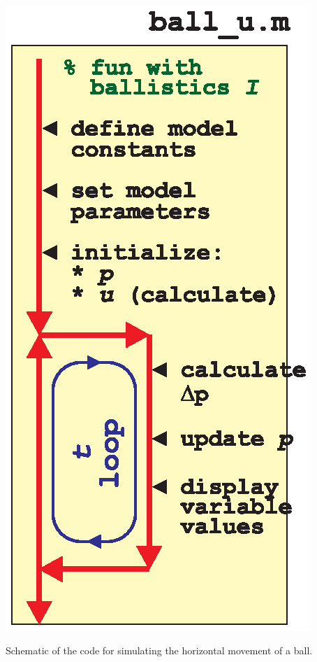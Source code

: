 \documentclass{tufte-book} %
\begin{document}
\begin{marginfigure}[-0.0in]
\includegraphics[width=\linewidth]{ch9-schematic-ball_u.eps}
\caption{Schematic of the code for simulating the horizontal movement of a ball.}
\label{fig:ch9-schematic-ball_u}
\end{marginfigure}
\end{document}
